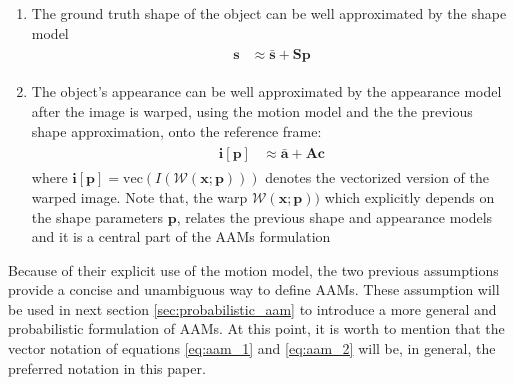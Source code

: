 \begin{enumerate}
	\item The ground truth shape of the object can be well approximated by the shape model
	\begin{eqnarray}
		\begin{aligned}
			\mathbf{s} & \approx \mathbf{\bar{s}} + \mathbf{S} \mathbf{p}
		\end{aligned}
	    \label{eq:aam_1}
	\end{eqnarray}

	\item The object's appearance can be well approximated by the appearance model after the image is warped, using the motion model and the the previous shape approximation, onto the reference frame:
	\begin{eqnarray}
		\begin{aligned}
			\mathbf{i}[\mathbf{p}] & \approx \mathbf{\bar{a}} + \mathbf{A} \mathbf{c} 
		\end{aligned}
	    \label{eq:aam_2}
	\end{eqnarray}
	where $\mathbf{i}[\mathbf{p}] = \mathrm{vec}(I(\mathcal{W}(\mathbf{x}; \mathbf{p})))$ denotes the vectorized version of the warped image. Note that, the warp $\mathcal{W}(\mathbf{x}; \mathbf{p}))$ which explicitly depends on the shape parameters $\mathbf{p}$, relates the previous shape and appearance models and it is a central part of the AAMs formulation
\end{enumerate}

Because of their explicit use of the motion model, the two previous assumptions provide a concise and unambiguous way to define AAMs. These assumption will be used in next section \ref{sec:probabilistic_aam} to introduce a more general and probabilistic formulation of AAMs. At this point, it is worth to mention that the vector notation of equations \ref{eq:aam_1} and \ref{eq:aam_2} will be, in general, the preferred notation in this paper.


